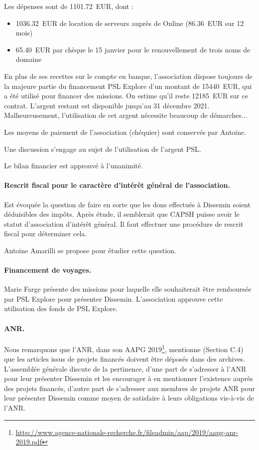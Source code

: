 \documentclass{scrartcl}
\begin{document}
Les dépenses sont de 1101.72~EUR, dont :

\begin{itemize}
  \item 1036.32~EUR de location de serveurs auprès de Online (86.36~EUR sur 12
    mois)
  \item 65.40~EUR par chèque le 15 janvier pour le renouvellement de trois noms
    de domaine
\end{itemize}

En plus de ses recettes sur le compte en banque, l'association dispose toujours
de la majeure partie du financement PSL Explore d'un montant de 15440~EUR, qui a
été utilisé pour financer des missions. 
On estime qu'il reste 12185~EUR sur ce contrat.
L'argent restant est disponible jusqu'au
31 décembre 2021. Malheureusement, l'utilisation de cet argent nécessite
beaucoup de démarches...

Les moyens de paiement de l'association (chéquier) sont conservés par Antoine.

Une discussion s'engage au sujet de l'utilisation de l'argent PSL.

Le bilan financier est approuvé à l'unanimité.

\paragraph{Rescrit fiscal pour le caractère d'intérêt général de l'association.}
Est évoquée la question de faire en sorte que les dons effectués à Dissemin
soient déduisibles des impôts. Après étude, il semblerait que CAPSH puisse avoir
le statut d'association d'intérêt général. Il faut effectuer une procédure de
rescrit fiscal pour déterminer cela.

Antoine Amarilli se propose pour étudier cette question.

\paragraph{Financement de voyages.}
Marie Farge présente des missions pour laquelle elle souhaiterait être
remboursée par PSL Explore pour présenter Dissemin. L'association approuve cette
utilisation des fonds de PSL Explore.

\paragraph{ANR.}
Nous remarquons que l'ANR, dans son AAPG 2019\footnote{\url{http://www.agence-nationale-recherche.fr/fileadmin/aap/2019/aapg-anr-2019.pdf}}, mentionne (Section C.4) que les
articles issus de projets financés doivent être déposés dans des archives.
L'assemblée générale discute de la pertinence, d'une part de s'adresser à l'ANR
pour leur présenter Dissemin et les encourager à en mentionner l'existence
auprès des projets financés, d'autre part de s'adresser aux membres de projets
ANR pour leur présenter Dissemin comme moyen de satisfaire à leurs obligations
vis-à-vis de l'ANR.
\end{document}
